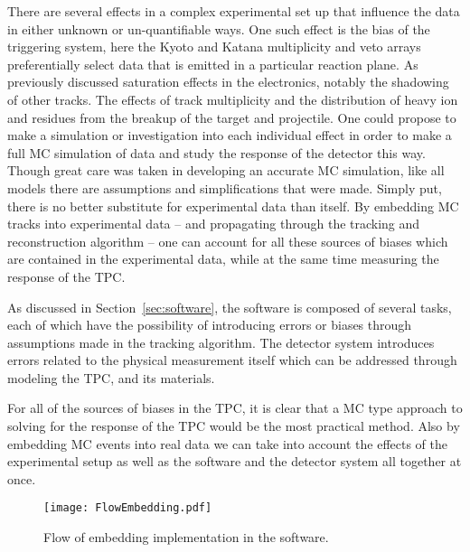 There are several effects in a complex experimental set up that influence the data in either unknown or un-quantifiable ways. One such effect is the bias of the triggering system, here the Kyoto and Katana multiplicity and veto arrays preferentially select data that is emitted in a particular reaction plane. As previously discussed saturation effects in the electronics, notably the shadowing of other tracks. The effects of track multiplicity and the distribution of heavy ion and residues from the breakup of the target and projectile. One could propose to make a simulation or investigation into each individual effect in order to make a full MC simulation of data and study the response of the detector this way. Though great care was taken in developing an accurate MC simulation, like all models there are assumptions and simplifications that were made. Simply put, there is no better substitute for experimental data than itself. By embedding MC tracks into experimental data -- and propagating through the tracking and reconstruction algorithm -- one can account for all these sources of biases which are contained in the experimental data, while at the same time measuring the response of the TPC.

As discussed in Section~\ref{sec:software}, the software is composed of several tasks, each of which have the possibility of introducing errors or biases through assumptions made in the tracking algorithm. The detector system introduces errors related to the physical measurement itself which can be addressed through modeling the TPC, and its materials. 

For all of the sources of biases in the TPC, it is clear that a MC type approach to solving for the response of the TPC would be the most practical method. Also by embedding MC events into real data we can take into account the effects of the experimental setup as well as the software and the detector system all together at once. 



\begin{figure}[H]
\centering
\texttt{[image: FlowEmbedding.pdf]}
\caption{Flow of embedding implementation in the software.}
\label{fig:flow}
\end{figure}

